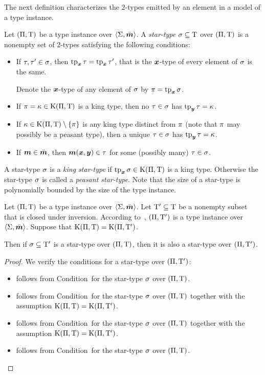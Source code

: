 The next definition characterizes the $2$-types emitted by an element in a model
of a type instance.
\begin{definition}
Let $(\Pi,\mathrm{T})$ be a type instance over $\left\langle \mathrm{\Sigma},\bar{\bm{m}} \right\rangle$.
A \emph{star-type} $\sigma \subseteq \mathrm{T}$ over $(\Pi,\mathrm{T})$ is a nonempty
set of $2$-types satisfying the following conditions:
\begin{itemize}
  \item[\condstpx]\label{cond:stpx}
  If $\tau, {\tau'} \in \sigma$, then $\operatorname{tp}_{\bm{x}}\tau = \operatorname{tp}_{\bm{x}}{\tau'}$, that is the
  $\bm{x}$-type of every element of $\sigma$ is the same.

  Denote the $\bm{x}$-type of any element of $\sigma$ by $\pi = \operatorname{tp}_{\bm{x}}\sigma$.
  \item[\condstpkx]\label{cond:stpkx}
  If $\pi = \kappa \in \mathrm{K}(\Pi,\mathrm{T})$ is a king type, then no
  $\tau\in\sigma$ has $\operatorname{tp}_{\bm{y}}\tau = \kappa$.
  \item[\condstpky]\label{cond:stpky}
  If $\kappa \in \mathrm{K}(\Pi,\mathrm{T}) \setminus \left\{\pi\right\}$ is any king type distinct
  from $\pi$ (note that $\pi$ may possibly be a peasant type), then
  a unique $\tau\in\sigma$ has $\operatorname{tp}_{\bm{y}}\tau = \kappa$.
  \item[\condstpm]\label{cond:stpm} If $\bm{m} \in \bar{\bm{m}}$, then $\bm{m}(\bm{x},\bm{y})
  \in \tau$ for some (possibly many) $\tau \in \sigma$.
\end{itemize}
A star-type $\sigma$ is a \emph{king star-type} if $\operatorname{tp}_{\bm{x}}\sigma \in
\mathrm{K}(\Pi,\mathrm{T})$ is a king type. 
Otherwise the star-type $\sigma$ is called a \emph{peasant star-type}.
Note that the size of a star-type is polynomially bounded by the size of the
type instance.
\end{definition}
\begin{remark}\label{rem:stp-sub}
Let $(\Pi,\mathrm{T})$ be a type instance over $\left\langle \mathrm{\Sigma},\bar{\bm{m}} \right\rangle$. Let ${\mathrm{T}'}
\subseteq \mathrm{T}$ be a nonempty subset that is closed under inversion. According
to~, $(\Pi,{\mathrm{T}'})$ is a type instance over
$\left\langle \mathrm{\Sigma},\bar{\bm{m}} \right\rangle$. Suppose that $\mathrm{K}(\Pi,\mathrm{T}) = \mathrm{K}(\Pi,{\mathrm{T}'})$.

Then if $\sigma \subseteq {\mathrm{T}'}$ is a star-type over $(\Pi,\mathrm{T})$, then it
is also a star-type over $(\Pi,{\mathrm{T}'})$.
\end{remark}
\begin{proof}
We verify the conditions for a star-type over $(\Pi,{\mathrm{T}'})$:
\begin{itemize}
  \item[\refcondstpx]
  follows from Condition~ for the star-type $\sigma$ over
  $(\Pi,\mathrm{T})$.
  \item[\refcondstpkx]
  follows from Condition~ for the star-type $\sigma$ over
  $(\Pi,\mathrm{T})$ together with the assumption $\mathrm{K}(\Pi,\mathrm{T}) =
  \mathrm{K}(\Pi,{\mathrm{T}'})$.
  \item[\refcondstpky]
  follows from Condition~ for the star-type $\sigma$ over
  $(\Pi,\mathrm{T})$ together with the assumption $\mathrm{K}(\Pi,\mathrm{T}) =
  \mathrm{K}(\Pi,{\mathrm{T}'})$.
  \item[\refcondstpm]
  follows from Condition~ for the star-type $\sigma$ over
  $(\Pi,\mathrm{T})$.
\end{itemize}
\end{proof}

